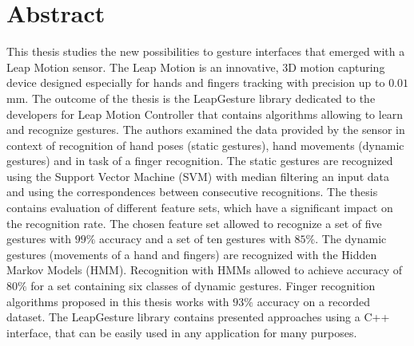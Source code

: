 \chapter*{Abstract}
This thesis studies the new possibilities to gesture interfaces that emerged with a Leap Motion sensor.
The Leap Motion is an innovative, 3D motion capturing device designed especially for hands and fingers tracking with precision up to $0.01$mm.
The outcome of the thesis is the LeapGesture library dedicated to the developers for Leap Motion Controller that contains algorithms allowing to learn and recognize gestures.
The authors examined the data provided by the sensor in context of recognition of hand poses (static gestures), hand movements (dynamic gestures) and in task of a finger recognition.
The static gestures are recognized using the Support Vector Machine (SVM) with median filtering an input data and using the correspondences between consecutive recognitions.
The thesis contains evaluation of different feature sets, which have a significant impact on the recognition rate.
The chosen feature set allowed to recognize a set of five gestures with $99\%$ accuracy and a set of ten gestures with $85\%$.
The dynamic gestures (movements of a hand and fingers) are recognized with the Hidden Markov Models (HMM). 
Recognition with HMMs allowed to achieve accuracy of $80\%$ for a set containing six classes of dynamic gestures.
Finger recognition algorithms proposed in this thesis works with $93\%$ accuracy on a recorded dataset.
The LeapGesture library contains presented approaches using a C++ interface, that can be easily used in any application for many purposes.